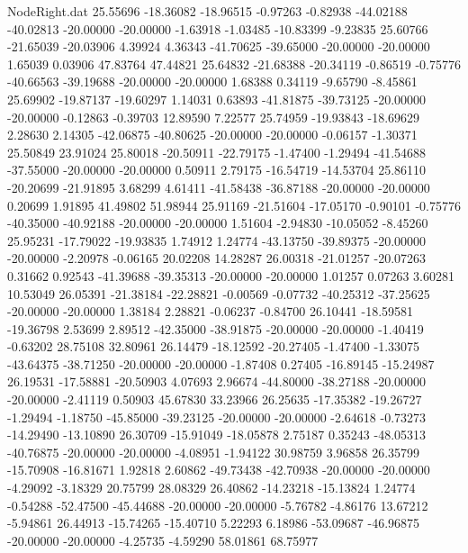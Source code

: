 \begin{filecontents}{NodeRight.dat}
  25.55696  -18.36082  -18.96515    -0.97263   -0.82938  -44.02188  -40.02813  -20.00000  -20.00000   -1.63918   -1.03485  -10.83399   -9.23835
  25.60766  -21.65039  -20.03906     4.39924    4.36343  -41.70625  -39.65000  -20.00000  -20.00000    1.65039    0.03906   47.83764   47.44821
  25.64832  -21.68388  -20.34119    -0.86519   -0.75776  -40.66563  -39.19688  -20.00000  -20.00000    1.68388    0.34119   -9.65790   -8.45861
  25.69902  -19.87137  -19.60297     1.14031    0.63893  -41.81875  -39.73125  -20.00000  -20.00000   -0.12863   -0.39703   12.89590    7.22577
  25.74959  -19.93843  -18.69629     2.28630    2.14305  -42.06875  -40.80625  -20.00000  -20.00000   -0.06157   -1.30371   25.50849   23.91024
  25.80018  -20.50911  -22.79175    -1.47400   -1.29494  -41.54688  -37.55000  -20.00000  -20.00000    0.50911    2.79175  -16.54719  -14.53704
  25.86110  -20.20699  -21.91895     3.68299    4.61411  -41.58438  -36.87188  -20.00000  -20.00000    0.20699    1.91895   41.49802   51.98944
  25.91169  -21.51604  -17.05170    -0.90101   -0.75776  -40.35000  -40.92188  -20.00000  -20.00000    1.51604   -2.94830  -10.05052   -8.45260
  25.95231  -17.79022  -19.93835     1.74912    1.24774  -43.13750  -39.89375  -20.00000  -20.00000   -2.20978   -0.06165   20.02208   14.28287
  26.00318  -21.01257  -20.07263     0.31662    0.92543  -41.39688  -39.35313  -20.00000  -20.00000    1.01257    0.07263    3.60281   10.53049
  26.05391  -21.38184  -22.28821    -0.00569   -0.07732  -40.25312  -37.25625  -20.00000  -20.00000    1.38184    2.28821   -0.06237   -0.84700
  26.10441  -18.59581  -19.36798     2.53699    2.89512  -42.35000  -38.91875  -20.00000  -20.00000   -1.40419   -0.63202   28.75108   32.80961
  26.14479  -18.12592  -20.27405    -1.47400   -1.33075  -43.64375  -38.71250  -20.00000  -20.00000   -1.87408    0.27405  -16.89145  -15.24987
  26.19531  -17.58881  -20.50903     4.07693    2.96674  -44.80000  -38.27188  -20.00000  -20.00000   -2.41119    0.50903   45.67830   33.23966
  26.25635  -17.35382  -19.26727    -1.29494   -1.18750  -45.85000  -39.23125  -20.00000  -20.00000   -2.64618   -0.73273  -14.29490  -13.10890
  26.30709  -15.91049  -18.05878     2.75187    0.35243  -48.05313  -40.76875  -20.00000  -20.00000   -4.08951   -1.94122   30.98759    3.96858
  26.35799  -15.70908  -16.81671     1.92818    2.60862  -49.73438  -42.70938  -20.00000  -20.00000   -4.29092   -3.18329   20.75799   28.08329
  26.40862  -14.23218  -15.13824     1.24774   -0.54288  -52.47500  -45.44688  -20.00000  -20.00000   -5.76782   -4.86176   13.67212   -5.94861
  26.44913  -15.74265  -15.40710     5.22293    6.18986  -53.09687  -46.96875  -20.00000  -20.00000   -4.25735   -4.59290   58.01861   68.75977

\end{filecontents}
